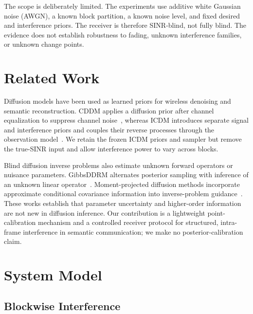 \documentclass[conference]{IEEEtran}
\begin{document}
The scope is deliberately limited. The experiments use additive white
Gaussian noise (AWGN), a known block partition, a known noise level, and
fixed desired and interference priors. The receiver is therefore SINR-blind,
not fully blind. The evidence does not establish robustness to fading,
unknown interference families, or unknown change points.

\section{Related Work}

Diffusion models have been used as learned priors for wireless denoising and
semantic reconstruction. CDDM applies a diffusion prior after channel
equalization to suppress channel noise~\cite{wu2024cddm}, whereas ICDM
introduces separate signal and interference priors and couples their reverse
processes through the observation model~\cite{wu2026icdm}. We retain the
frozen ICDM priors and sampler but remove the true-SINR input and allow
interference power to vary across blocks.

Blind diffusion inverse problems also estimate unknown forward operators or
nuisance parameters. GibbsDDRM alternates posterior sampling with inference
of an unknown linear operator~\cite{murata2023gibbsddrm}. Moment-projected
diffusion methods incorporate approximate conditional covariance information
into inverse-problem guidance~\cite{boys2024tweedie}. These works establish
that parameter uncertainty and higher-order information are not new in
diffusion inference. Our contribution is a lightweight point-calibration
mechanism and a controlled receiver protocol for structured, intra-frame
interference in semantic communication; we make no posterior-calibration
claim.

\section{System Model}

\subsection{Blockwise Interference}
\end{document}
